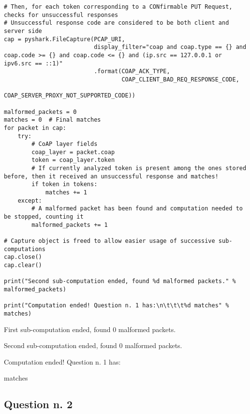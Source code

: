 \documentclass[a4paper,11pt]{article} %
\begin{document}
    \begin{verbatim}
# Then, for each token corresponding to a CONfirmable PUT Request, checks for unsuccessful responses
# Unsuccessful response code are considered to be both client and server side
cap = pyshark.FileCapture(PCAP_URI,
                          display_filter="coap and coap.type == {} and coap.code >= {} and coap.code <= {} and (ip.src == 127.0.0.1 or ipv6.src == ::1)"
                          .format(COAP_ACK_TYPE,
                                  COAP_CLIENT_BAD_REQ_RESPONSE_CODE,
                                  COAP_SERVER_PROXY_NOT_SUPPORTED_CODE))

malformed_packets = 0
matches = 0  # Final matches
for packet in cap:
    try:
        # CoAP layer fields
        coap_layer = packet.coap
        token = coap_layer.token
        # If currently analyzed token is present among the ones stored before, then it received an unsuccessful response and matches!
        if token in tokens:
            matches += 1
    except:
        # A malformed packet has been found and computation needed to be stopped, counting it
        malformed_packets += 1

# Capture object is freed to allow easier usage of successive sub-computations
cap.close()
cap.clear()

print("Second sub-computation ended, found %d malformed packets." % malformed_packets)

print("Computation ended! Question n. 1 has:\n\t\t\t%d matches" % matches)
    \end{verbatim}

    \begin{tcolorbox}
        First sub-computation ended, found 0 malformed packets.

        Second sub-computation ended, found 0 malformed packets.

        Computation ended! Question n. 1 has:

        \qquad \qquad {} matches
    \end{tcolorbox}

    \subsection{Question n. 2}\label{subsec:question-n.-2}
\end{document}
